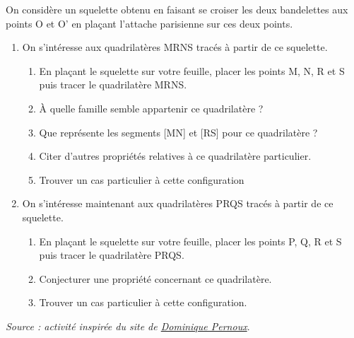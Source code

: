 \begin{activite}
\begin{changemargin}{-10mm}{-15mm}
            On considère un squelette obtenu en faisant se croiser les deux bandelettes aux points O et O' en plaçant l'attache parisienne sur ces deux points. 
            \begin{enumerate}
              \item On s'intéresse aux quadrilatères MRNS tracés à partir de ce squelette.
              \begin{enumerate}
                \item En plaçant le squelette sur votre feuille, placer les points M, N, R et S puis tracer le quadrilatère MRNS. \medskip
                \item À quelle famille semble appartenir ce quadrilatère ? \pointilles \medskip
                \item Que représente les segments [MN] et [RS] pour ce quadrilatère ? \pointilles \medskip
                \item Citer d'autres propriétés relatives à ce quadrilatère particulier. \pointilles 
                
                \medskip\pointilles
                \item Trouver un cas particulier à cette configuration \pointilles \\
              \end{enumerate}
              \item On s'intéresse maintenant aux quadrilatères PRQS tracés à partir de ce squelette.
              \begin{enumerate}
                 \item En plaçant le squelette sur votre feuille, placer les points P, Q, R et S puis tracer le quadrilatère PRQS. \medskip
                 \item Conjecturer une propriété concernant ce quadrilatère. \pointilles \medskip
                 \item Trouver un cas particulier à cette configuration. \pointilles
              \end{enumerate}
           \end{enumerate} 
  
        \vfill\hfill{\it\footnotesize Source : activité inspirée du site de \href{http://pernoux.pagesperso-orange.fr/revision/revgeo.pdf}{Dominique Pernoux}}.
    \end{changemargin}
\end{activite}
